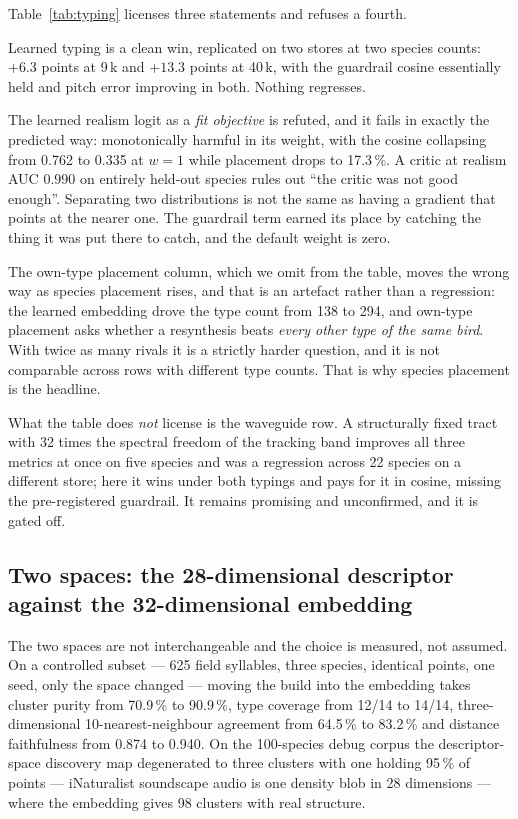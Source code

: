 \documentclass[10pt,twocolumn,a4paper]{article}
\begin{document}
Table~\ref{tab:typing} licenses three statements and refuses a fourth.

Learned typing is a clean win, replicated on two stores at two species counts:
$+6.3$ points at 9\,k and $+13.3$ points at 40\,k, with the guardrail cosine essentially
held and pitch error improving in both. Nothing regresses.

The learned realism logit as a \emph{fit objective} is refuted, and it fails in exactly the
predicted way: monotonically harmful in its weight, with the cosine collapsing from 0.762
to 0.335 at $w = 1$ while placement drops to 17.3\,\%. A critic at realism AUC 0.990 on
entirely held-out species rules out ``the critic was not good enough''. Separating two
distributions is not the same as having a gradient that points at the nearer one. The
guardrail term earned its place by catching the thing it was put there to catch, and the
default weight is zero.

The own-type placement column, which we omit from the table, moves the wrong way as species
placement rises, and that is an artefact rather than a regression: the learned embedding
drove the type count from 138 to 294, and own-type placement asks whether a resynthesis
beats \emph{every other type of the same bird}. With twice as many rivals it is a strictly
harder question, and it is not comparable across rows with different type counts. That is
why species placement is the headline.

What the table does \emph{not} license is the waveguide row. A structurally fixed tract with
32 times the spectral freedom of the tracking band improves all three metrics at once on
five species and was a regression across 22 species on a different store; here it wins under
both typings and pays for it in cosine, missing the pre-registered guardrail. It remains
promising and unconfirmed, and it is gated off.

\subsection{Two spaces: the 28-dimensional descriptor against the 32-dimensional embedding}

The two spaces are not interchangeable and the choice is measured, not assumed. On a
controlled subset --- 625 field syllables, three species, identical points, one seed, only
the space changed --- moving the build into the embedding takes cluster purity from
70.9\,\% to 90.9\,\%, type coverage from 12/14 to 14/14, three-dimensional 10-nearest-neighbour
agreement from 64.5\,\% to 83.2\,\% and distance faithfulness from 0.874 to 0.940.
On the 100-species debug corpus the descriptor-space discovery map degenerated to three
clusters with one holding 95\,\% of points --- iNaturalist soundscape audio is one density
blob in 28 dimensions --- where the embedding gives 98 clusters with real structure.
\end{document}
